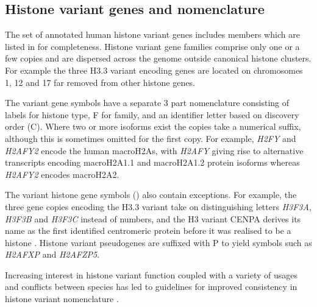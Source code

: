 \subsection{Histone variant genes and nomenclature}
	The set of annotated human histone variant genes 
	includes  members 
	which are listed in  for completeness.
	Histone variant gene families comprise only one or a few copies 
	and are dispersed across the genome outside canonical histone clusters.
	For example the three H3.3 variant encoding genes are located 
	on chromosomes 1, 12 and 17 far removed from other histone genes.

	The variant gene symbols have a separate 3 part nomenclature 
	consisting of labels for histone type, F for family, 
	and an identifier letter based on discovery order (C).
	Where two or more isoforms exist the copies take a numerical suffix, 
	although this is sometimes omitted for the first copy. 
	For example, \textit{H2FY} and \textit{H2AFY2} encode the human macroH2As, 
	with \textit{H2AFY} giving rise to alternative transcripts encoding macroH2A1.1 and macroH2A1.2 protein isoforms 
	whereas \textit{H2AFY2} encodes macroH2A2.

	The variant histone gene symbols () also contain exceptions.
	For example, the three gene copies encoding the H3.3 variant 
	take on distinguishing letters \textit{H3F3A}, \textit{H3F3B} and \textit{H3F3C} instead of numbers, 
	and the H3 variant CENPA derives its name as the first identified centromeric protein \cite{CENPA-first-report} 
	before it was realised to be a histone \citep{CENPA-copurifies-histones, CENPA-sequence-analysis}.
	Histone variant pseudogenes are suffixed with P to yield symbols such as \textit{H2AFXP} and \textit{H2AFZP5}.

	Increasing interest in histone variant function \citep{MazeAllis2014}
	coupled with a variety of usages and conflicts between species 
	has led to guidelines for improved consistency in histone variant nomenclature \citep{Talbert2012}.

